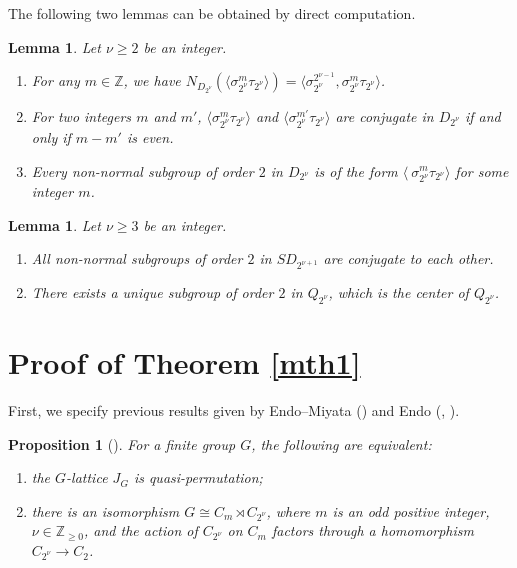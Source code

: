 \documentclass[12pt]{amsart}
\theoremstyle{plain}
\newtheorem{prop}[thm]{Proposition}
\newtheorem{lem}[thm]{Lemma}
\theoremstyle{definition}
\numberwithin{thm}{section}
\numberwithin{equation}{section}
\newcommand{\Znn}{\mathbb{Z}_{\geq 0}}
\newcommand{\Z}{\mathbb{Z}}
\begin{document}
The following two lemmas can be obtained by direct computation.

\begin{lem}\label{lem:nodt}
Let $\nu \geq 2$ be an integer. 
\begin{enumerate}
\item For any $m\in \Z$, we have $N_{D_{2^{\nu}}}(\langle \sigma_{2^{\nu}}^{m}\tau_{2^{\nu}}\rangle)=\langle \sigma_{2^{\nu}}^{2^{\nu-1}}, \sigma_{2^{\nu}}^{m}\tau_{2^{\nu}}\rangle$. 
\item For two integers $m$ and $m'$, $\langle \sigma_{2^{\nu}}^{m}\tau_{2^{\nu}}\rangle$ and $\langle \sigma_{2^{\nu}}^{m'}\tau_{2^{\nu}}\rangle$ are conjugate in $D_{2^{\nu}}$ if and only if $m-m'$ is even. 
\item Every non-normal subgroup of order $2$ in $D_{2^{\nu}}$ is of the form $\langle \
\sigma_{2^{\nu}}^{m}\tau_{2^{\nu}}\rangle$ for some integer $m$. 
\end{enumerate}
\end{lem}

\begin{lem}\label{lem:nomx}
Let $\nu \geq 3$ be an integer. 
\begin{enumerate}
\item All non-normal subgroups of order $2$ in $SD_{2^{\nu+1}}$ are conjugate to each other. 
\item There exists a unique subgroup of order $2$ in $Q_{2^{\nu}}$, which is the center of $Q_{2^{\nu}}$. 
\end{enumerate}
\end{lem}

\section{Proof of Theorem \ref{mth1}}\label{sect:pfod}

First, we specify previous results given by Endo--Miyata (\cite{Endo1975}) and Endo (\cite{Endo2001}, \cite{Endo2011}). 

\begin{prop}[{\cite[Theorem 2.3]{Endo1975}}]\label{prop:emqp}
For a finite group $G$, the following are equivalent: 
\begin{enumerate}
    \item the $G$-lattice $J_{G}$ is quasi-permutation; 
    \item there is an isomorphism $G\cong C_{m}\rtimes C_{2^{\nu}}$, where $m$ is an odd positive integer, $\nu \in \Znn$, and the action of $C_{2^{\nu}}$ on $C_{m}$ factors through a homomorphism $C_{2^{\nu}}\rightarrow C_{2}$. 
\end{enumerate}
\end{prop}
\end{document}
